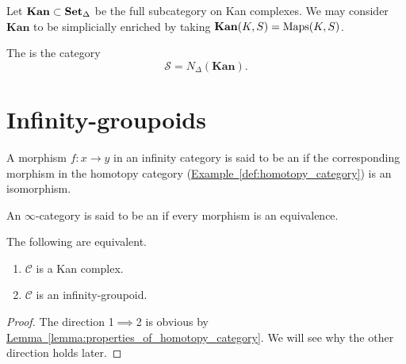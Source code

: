 \documentclass[main.tex]{subfiles}
\begin{document}
\begin{example}
  Let $\mathbf{Kan} \subset \operatorname{\mathbf{Set}_{\Delta}}$ be the full subcategory on Kan complexes. We may consider $\mathbf{Kan}$ to be simplicially enriched by taking $\mathbf{Kan}(K, S) = \operatorname{Maps}(K, S)$.
\end{example}

\begin{definition}
  \label{def:category_of_spaces}
  The  is the category
  \begin{equation*}
    \mathcal{S} = N_{\Delta}(\textbf{Kan}).
  \end{equation*}
\end{definition}

\section{Infinity-groupoids}
\label{sec:infinity_groupoids}

\begin{definition}[equivalence]
  \label{def:equivalence}
  A morphism $f\colon x \to y$ in an infinity category is said to be an  if the corresponding morphism in the homotopy category (\hyperref[def:homotopy_category]{Example~\ref*{def:homotopy_category}}) is an isomorphism.
\end{definition}

\begin{definition}
  \label{def:infinity_groupoid}
  An $\infty$-category is said to be an  if every morphism is an equivalence.
\end{definition}

\begin{theorem}
  \label{thm:infinity_groupoid_iff_kan_complex}
  The following are equivalent.
  \begin{enumerate}
    \item $\mathcal{C}$ is a Kan complex.

    \item $\mathcal{C}$ is an infinity-groupoid.
  \end{enumerate}
\end{theorem}
\begin{proof}
  The direction 1$\implies$2 is obvious by \hyperref[lemma:properties_of_homotopy_category]{Lemma~\ref*{lemma:properties_of_homotopy_category}}. We will see why the other direction holds later.
\end{proof}
\end{document}
